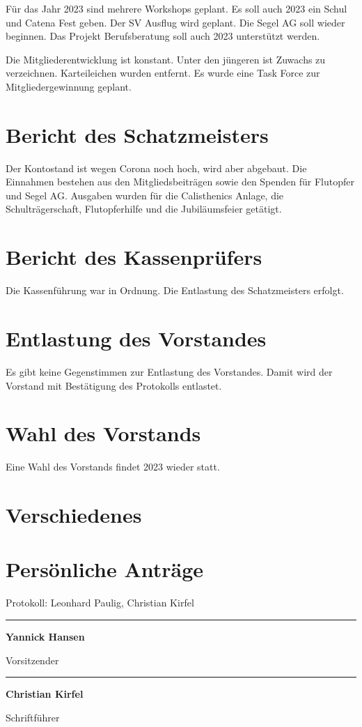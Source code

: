 \documentclass[a4paper, 11pt]{article}
\newcommand\signature[2]{%
\noindent\begin{minipage}{5cm}
    \noindent\vspace{3cm}\par
    \noindent\rule{5cm}{1pt}\par
    \noindent\textbf{#1}\par
    \noindent#2%
\end{minipage}}
\begin{document}
Für das Jahr 2023 sind mehrere Workshops geplant.
Es soll auch 2023 ein Schul und Catena Fest geben.
Der SV Ausflug wird geplant.
Die Segel AG soll wieder beginnen.
Das Projekt Berufsberatung soll auch 2023 unterstützt werden.

Die Mitgliederentwicklung ist konstant.
Unter den jüngeren ist Zuwachs zu verzeichnen.
Karteileichen wurden entfernt.
Es wurde eine Task Force zur Mitgliedergewinnung geplant.


\section*{Bericht des Schatzmeisters}

Der Kontostand ist wegen Corona noch hoch, wird aber abgebaut.
Die Einnahmen bestehen aus den Mitgliedsbeiträgen sowie den Spenden für Flutopfer und Segel AG.
Ausgaben wurden für die Calisthenics Anlage, die Schulträgerschaft, Flutopferhilfe und die Jubiläumsfeier getätigt.


\section*{Bericht des Kassenprüfers}

Die Kassenführung war in Ordnung.
Die Entlastung des Schatzmeisters erfolgt.


\section*{Entlastung des Vorstandes}

Es gibt keine Gegenstimmen zur Entlastung des Vorstandes. Damit wird der Vorstand mit Bestätigung des Protokolls entlastet.

\section*{Wahl des Vorstands}

Eine Wahl des Vorstands findet 2023 wieder statt.


\section*{Verschiedenes}

\section*{Persönliche Anträge}

\newpage

Protokoll: Leonhard Paulig, Christian Kirfel


\signature{Yannick Hansen}{Vorsitzender}\hfill\signature{Christian Kirfel}{Schriftführer}
\end{document}

